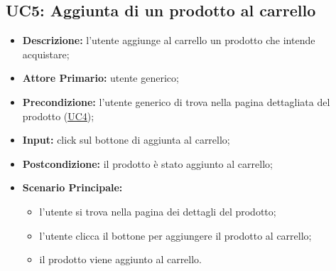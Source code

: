 \subsection{UC5: Aggiunta di un prodotto al carrello}
\label{sec:UC5}
\begin{itemize}
    \item \textbf{Descrizione:} l'utente aggiunge al carrello un prodotto che intende acquistare;
    \item \textbf{Attore Primario:} utente generico;
    \item \textbf{Precondizione:} l'utente generico di trova nella pagina dettagliata del prodotto (\hyperref[sec:UC4]{\underline{UC4}});
    \item \textbf{Input:} click sul bottone di aggiunta al carrello;
    \item \textbf{Postcondizione:} il prodotto è stato aggiunto al carrello;
    \item \textbf{Scenario Principale:}
          \begin{itemize}
              \item l'utente si trova nella pagina dei dettagli del prodotto;
              \item l'utente clicca il bottone per aggiungere il prodotto al carrello;
              \item il prodotto viene aggiunto al carrello.
          \end{itemize}
\end{itemize}
\newpage